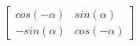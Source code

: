 \documentclass[preview]{standalone}
\begin{document}
\begin{align*}
\begin{bmatrix} cos(-\alpha) & sin(\alpha) \\ -sin(\alpha) & cos(-\alpha)\end{bmatrix}
\end{align*}
\end{document}

